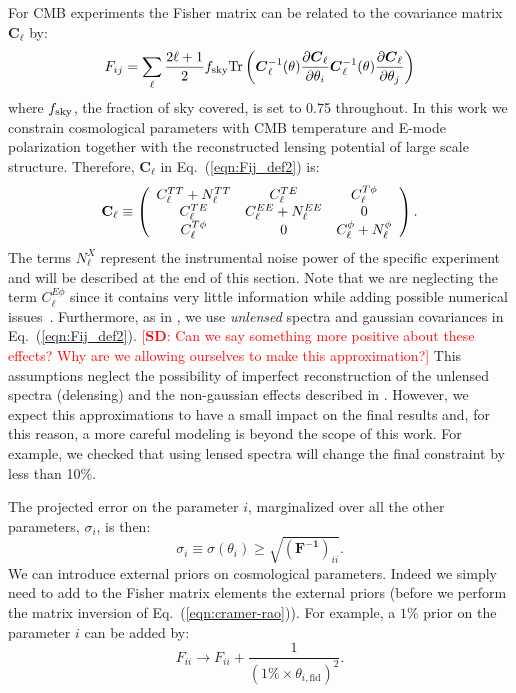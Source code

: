 \documentclass[aps,prd,reprint,superscriptaddress]{revtex4-1}
\newcommand{\sd}[1]{\textcolor{red}{[{\bf SD}: #1]}}
\newcommand\refeq[1]{Eq.~(\ref{eqn:#1})}
\begin{document}
For CMB experiments the Fisher matrix can be related to the covariance matrix $\boldsymbol{C}_\ell$ by:
\begin{equation}
 F_{ij} = \sum_\ell \frac{2\ell+1}{2} f_{\rm sky} {\rm Tr} \left(  \boldsymbol{C}^{-1}_\ell( \theta) \frac{\partial \boldsymbol{C}_\ell}{\partial \theta_i} \boldsymbol{C}^{-1}_\ell( \theta) \frac{\partial \boldsymbol{C}_\ell}{\partial \theta_j}  \right)
 \label{eqn:Fij_def2}
 \end{equation}
 where $f_{\rm sky}$, the fraction of sky covered, is set to 0.75 throughout.
In this work we constrain cosmological parameters with CMB temperature and E-mode polarization together with the reconstructed lensing potential of large scale structure. Therefore, $\boldsymbol{C}_\ell$ in \refeq{Fij_def2} is:
 \begin{eqnarray}
 	\centering
		\mathbf{C}_\ell \equiv \left( \begin{array}{ccc}C_\ell^{TT} + N_\ell^{TT} & C_\ell^{TE} & C_\ell^{T\phi} \\ C_\ell^{TE} & C_\ell^{EE} + N_\ell^{EE} & 0 \\ C_\ell^{T\phi} & 0 & C_\ell^{\phi} + N_\ell^{\phi}\end{array}\right).
	\label{eqn:cov_definition}
\end{eqnarray}
The terms $N_\ell^{X}$ represent the instrumental noise power of the specific experiment and will be described at the end of this section.
Note that we are neglecting the term $C_\ell^{E\phi}$ since it  contains very little information while adding possible numerical issues~\cite{wu:2014,2013PhRvD..87h3008H}.
Furthermore, as in \cite{wu:2014}, we use \textit{unlensed} spectra and gaussian covariances in \refeq{Fij_def2}. 
\sd{Can we say something more positive about these effects? Why are we allowing ourselves to make this approximation?} This assumptions neglect the possibility of imperfect reconstruction of the unlensed spectra (delensing) and the non-gaussian effects described in \cite{benoit-levy:2012}.
However, we expect this approximations to have a small impact on the final results and, for this reason, a more careful modeling is beyond the scope of this work. For example, we checked that using lensed spectra will change the final constraint by less than 10$\%$.

The projected error on the parameter $i$, marginalized over all the other parameters, $\sigma_i$, is then:
\begin{equation}
\sigma_i \equiv \sigma (\theta_i) \geq \sqrt{(\mathbf{ F^{-1}})_{ii}}.
\label{eqn:cramer-rao}
\end{equation}
We can introduce external priors on cosmological parameters.
Indeed we simply need to add to the Fisher matrix elements the external priors (before we perform the matrix inversion of \refeq{cramer-rao}).
For example, a $1\%$ prior on the parameter $i$ can be added by:
\begin{equation}
F_{ii} \rightarrow F_{ii} + \frac{1}{(1\% \times  \theta_{i,\text{fid}})^2}.
\end{equation}
\end{document}
